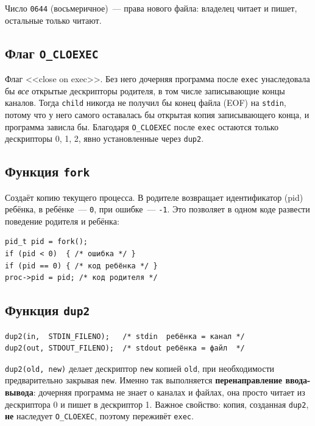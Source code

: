 \documentclass[11pt, a4paper]{article}
\begin{document}
Число \texttt{0644} (восьмеричное)~--- права нового файла: владелец читает и
пишет, остальные только читают.

\subsection{Флаг \texttt{O\_CLOEXEC}}

Флаг <<close on exec>>. Без него дочерняя программа после \texttt{exec}
унаследовала бы \textit{все} открытые дескрипторы родителя, в том числе
записывающие концы каналов. Тогда \texttt{child} никогда не получил бы
конец файла (EOF) на \texttt{stdin}, потому что у него самого оставалась бы
открытая копия записывающего конца, и программа зависла бы. Благодаря
\texttt{O\_\allowbreak{}CLOEXEC} после \texttt{exec} остаются только дескрипторы 0, 1, 2,
явно установленные через \texttt{dup2}.

\subsection{Функция \texttt{fork}}

Создаёт копию текущего процесса. В родителе возвращает идентификатор
(pid) ребёнка, в ребёнке~--- \texttt{0}, при ошибке~--- \texttt{-1}.
Это позволяет в одном коде развести поведение родителя и ребёнка:

\begin{lstlisting}
pid_t pid = fork();
if (pid < 0)  { /* ошибка */ }
if (pid == 0) { /* код ребёнка */ }
proc->pid = pid; /* код родителя */
\end{lstlisting}

\subsection{Функция \texttt{dup2}}

\begin{lstlisting}
dup2(in,  STDIN_FILENO);   /* stdin  ребёнка = канал */
dup2(out, STDOUT_FILENO);  /* stdout ребёнка = файл  */
\end{lstlisting}

\texttt{dup2(old, new)} делает дескриптор \texttt{new} копией \texttt{old},
при необходимости предварительно закрывая \texttt{new}. Именно так выполняется
\textbf{перенаправление ввода-вывода}: дочерняя программа не знает о каналах
и файлах, она просто читает из дескриптора 0 и пишет в дескриптор 1.
Важное свойство: копия, созданная \texttt{dup2}, \textbf{не} наследует
\texttt{O\_\allowbreak{}CLOEXEC}, поэтому переживёт \texttt{exec}.
\end{document}
